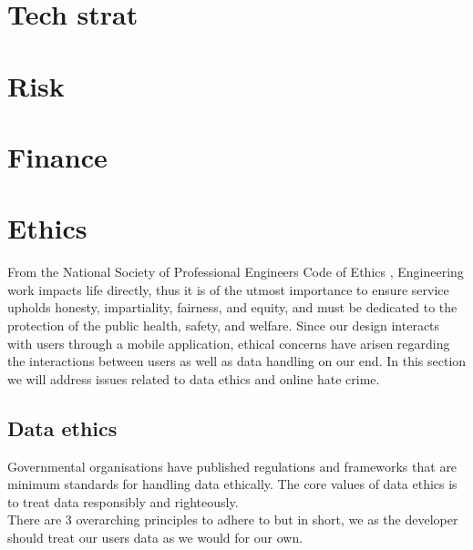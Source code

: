 \section{Tech strat}

\section{Risk}


\section{Finance}

\section{Ethics}
From the National Society of Professional Engineers Code of Ethics \cite{codeofethics}, Engineering
work impacts life directly, thus it is of the utmost importance to ensure service 
upholds honesty, impartiality, fairness, and equity, and must be dedicated to the protection of
the public health, safety, and welfare. Since our design interacts with users
through a mobile application, ethical concerns have arisen regarding the interactions between users 
as well as data handling on our end. In this section we will address issues related to data ethics 
and online hate crime.

\subsection{Data ethics}
Governmental organisations have published regulations \cite{EUdataregulations2018} and frameworks
\cite{framework} that are minimum standards for handling data ethically. The core values of data ethics 
is to treat data responsibly and righteously.
\\
There are 3 overarching principles\cite{framework} to adhere to but in short, we as the developer should treat our 
users\textsc{} data as we would for our own.

